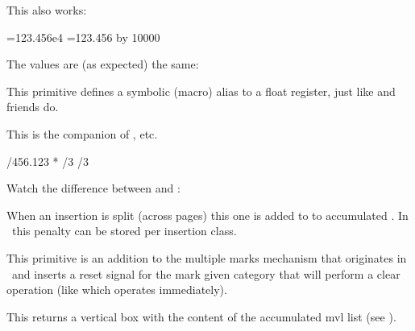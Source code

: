 This also works:

\startbuffer
{}=123.456e4
=123.456    \multiply{} by 10000
\the{}
\the{}
\stopbuffer

\typebuffer

The values are (as expected) the same:

\startlines \getbuffer \stoplines

\stopnewprimitive

\startnewprimitive[title={\prm {floatdef}}]

This primitive defines a symbolic (macro) alias to a float register, just like
 and friends do.

\stopnewprimitive

\startnewprimitive[title={\prm {floatexpr}}]

This is the companion of ,  etc.

\startbuffer
{}
\the   {}/456.123     \relax
\the   {}*\scratchcounter \relax
\the   \floatexpr \scratchcounter/3   \relax
\number\floatexpr \scratchcounter/3   \relax
\stopbuffer

\typebuffer

Watch the difference between  and :

\startlines \getbuffer \stoplines

\stopnewprimitive

\startoldprimitive[title={\prm {floatingpenalty}}]

When an insertion is split (across pages) this one is added to to accumulated
. In \LUAMETATEX\ this penalty can be stored per insertion
class.

\stopoldprimitive

\startnewprimitive[title={\prm {flushmarks}}]

This primitive is an addition to the multiple marks mechanism that originates in
\ETEX\ and inserts a reset signal for the mark given category that will perform a
clear operation (like  which operates immediately).

\stopnewprimitive

\startnewprimitive[title={\prm {flushmvl}}]

This returns a vertical box with the content of the accumulated mvl list (see
).

\stopnewprimitive

\startoldprimitive[title={\prm {font}}]

